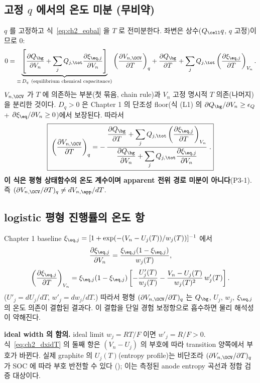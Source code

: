 \subsection{고정 $q$ 에서의 온도 미분 (무비약)}
$q$ 를 고정하고 식~\eqref{eq:ch2_eqbal} 을 $T$ 로 전미분한다. 좌변은 상수($Q_\cell q$, $q$ 고정)이므로 $0$:
\begin{equation}
0=\underbrace{\left[\frac{\partial Q_\bg}{\partial V_n}+\sum_{j}Q_{j,\tot}\frac{\partial\xi_{\eq,j}}{\partial V_n}\right]}_{\equiv\,D_q\ (\text{equilibrium chemical capacitance})}
\left(\frac{\partial V_{n,\OCV}}{\partial T}\right)_q
+\frac{\partial Q_\bg}{\partial T}+\sum_{j}Q_{j,\tot}\left(\frac{\partial\xi_{\eq,j}}{\partial T}\right)_{V_n}.
\label{eq:ch2_implicitT}
\end{equation}
$V_{n,\OCV}$ 가 $T$ 에 의존하는 부분(첫 묶음, chain rule)과 $V_n$ 고정 명시적 $T$ 의존(나머지)을 분리한 것이다.
$D_q>0$ 은 Chapter 1 의 단조성 floor(식 (L1) 의 $\partial Q_\bg/\partial V_n\ge\epsilon_Q$ + $\partial\xi_\eq/\partial V_n\ge0$)에서 보장된다. 따라서
\begin{equation}
\boxed{\;\left(\frac{\partial V_{n,\OCV}}{\partial T}\right)_q
=-\,\frac{\dfrac{\partial Q_\bg}{\partial T}+\displaystyle\sum_{j}Q_{j,\tot}\left(\dfrac{\partial\xi_{\eq,j}}{\partial T}\right)_{V_n}}
{\dfrac{\partial Q_\bg}{\partial V_n}+\displaystyle\sum_{j}Q_{j,\tot}\dfrac{\partial\xi_{\eq,j}}{\partial V_n}}\;.}
\label{eq:ch2_dVocvdT}
\end{equation}
\textbf{이 식은 평형 상태함수의 온도 계수이며 apparent 전위 경로 미분이 아니다}(P3-1). 즉
$(\partial V_{n,\OCV}/\partial T)_q\ne dV_{n,\app}/dT$.

\subsection{logistic 평형 진행률의 온도 항}
Chapter 1 baseline $\xi_{\eq,j}=[1+\exp(-(V_n-U_j(T))/w_j(T))]^{-1}$ 에서
\begin{equation}
\frac{\partial\xi_{\eq,j}}{\partial V_n}=\frac{\xi_{\eq,j}(1-\xi_{\eq,j})}{w_j(T)},
\label{eq:ch2_dxidV}
\end{equation}
\begin{equation}
\left(\frac{\partial\xi_{\eq,j}}{\partial T}\right)_{V_n}
=\xi_{\eq,j}(1-\xi_{\eq,j})\left[-\frac{U'_j(T)}{w_j(T)}-\frac{V_n-U_j(T)}{w_j(T)^2}\,w'_j(T)\right].
\label{eq:ch2_dxidT}
\end{equation}
($U'_j=dU_j/dT$, $w'_j=dw_j/dT$.) 따라서 평형 $(\partial V_{n,\OCV}/\partial T)_q$ 는 $Q_\bg$, $U_j$, $w_j$,
$\xi_{\eq,j}$ 의 온도 의존이 결합된 결과다. 이 결합을 단일 경험 보정항으로 흡수하면 물리 해석성이 약해진다.
\begin{boundbox}
\textbf{ideal width 의 함의.} ideal limit $w_j=RT/F$ 이면 $w'_j=R/F>0$. 식~\eqref{eq:ch2_dxidT} 의 둘째 항은
$(V_n-U_j)$ 의 부호에 따라 transition 양쪽에서 부호가 바뀐다. 실제 graphite 의 $U_j(T)$(entropy
profile)는 비단조라 $(\partial V_{n,\OCV}/\partial T)_q$ 가 SOC 에 따라 부호 반전할 수 있다
\cite{thomasnewman2003,reynier2004}(); 이는 측정된 anode entropy 곡선과 정합 검증 대상이다.
\end{boundbox}

